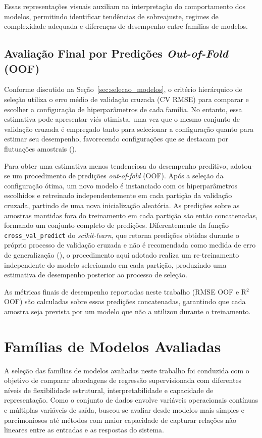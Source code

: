Essas representações visuais auxiliam na interpretação do comportamento dos modelos, permitindo identificar tendências de sobreajuste, regimes de complexidade adequada e diferenças de desempenho entre famílias de modelos.

\subsection{Avaliação Final por Predições \textit{Out-of-Fold} (OOF)}
\label{sec:avaliacao_oof}

Conforme discutido na Seção~\ref{sec:selecao_modelos}, o critério hierárquico de seleção utiliza o erro médio de validação cruzada (CV RMSE) para comparar e escolher a configuração de hiperparâmetros de cada família. No entanto, essa estimativa pode apresentar viés otimista, uma vez que o mesmo conjunto de validação cruzada é empregado tanto para selecionar a configuração quanto para estimar seu desempenho, favorecendo configurações que se destacam por flutuações amostrais (\cite{Cawley2010Overfitting}).

Para obter uma estimativa menos tendenciosa do desempenho preditivo, adotou-se um procedimento de predições \textit{out-of-fold} (OOF). Após a seleção da configuração ótima, um novo modelo é instanciado com os hiperparâmetros escolhidos e retreinado independentemente em cada partição da validação cruzada, partindo de uma nova inicialização aleatória. As predições sobre as amostras mantidas fora do treinamento em cada partição são então concatenadas, formando um conjunto completo de predições. Diferentemente da função \texttt{cross\_val\_predict} do \textit{scikit-learn}, que retorna predições obtidas durante o próprio processo de validação cruzada e não é recomendada como medida de erro de generalização (\cite{sklearn_cv_docs}), o procedimento aqui adotado realiza um re-treinamento independente do modelo selecionado em cada partição, produzindo uma estimativa de desempenho posterior ao processo de seleção.

As métricas finais de desempenho reportadas neste trabalho (RMSE OOF e R$^2$ OOF) são calculadas sobre essas predições concatenadas, garantindo que cada amostra seja prevista por um modelo que não a utilizou durante o treinamento.

\section{Famílias de Modelos Avaliadas}

A seleção das famílias de modelos avaliadas neste trabalho foi conduzida com o objetivo de comparar abordagens de regressão supervisionada com diferentes níveis de flexibilidade estrutural, interpretabilidade e capacidade de representação. Como o conjunto de dados envolve variáveis operacionais contínuas e múltiplas variáveis de saída, buscou-se avaliar desde modelos mais simples e parcimoniosos até métodos com maior capacidade de capturar relações não lineares entre as entradas e as respostas do sistema.


